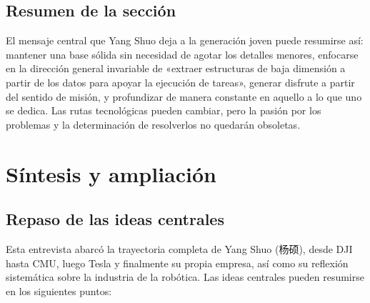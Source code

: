 \documentclass[a4paper]{article}
\begin{document}
\subsection{Resumen de la sección}

El mensaje central que Yang Shuo deja a la generación joven puede resumirse así: mantener una base sólida sin necesidad de agotar los detalles menores, enfocarse en la dirección general invariable de «extraer estructuras de baja dimensión a partir de los datos para apoyar la ejecución de tareas», generar disfrute a partir del sentido de misión, y profundizar de manera constante en aquello a lo que uno se dedica. Las rutas tecnológicas pueden cambiar, pero la pasión por los problemas y la determinación de resolverlos no quedarán obsoletas.
\section{Síntesis y ampliación}

\subsection{Repaso de las ideas centrales}

Esta entrevista abarcó la trayectoria completa de Yang Shuo (杨硕), desde DJI hasta CMU, luego Tesla y finalmente su propia empresa, así como su reflexión sistemática sobre la industria de la robótica. Las ideas centrales pueden resumirse en los siguientes puntos:
\end{document}
